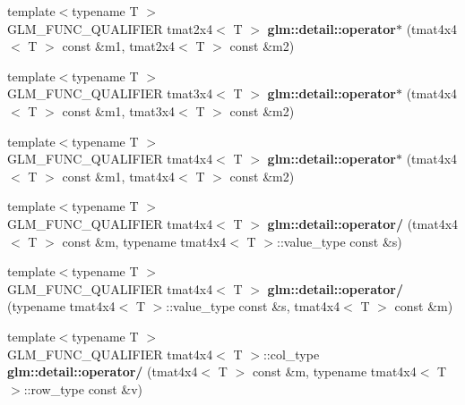\begin{DoxyCompactItemize}
\item 
\hypertarget{namespaceglm_1_1detail_a9ffe734881cad285ce8be6f50b225dd6}{}{\footnotesize template$<$typename T $>$ }\\G\+L\+M\+\_\+\+F\+U\+N\+C\+\_\+\+Q\+U\+A\+L\+I\+F\+I\+E\+R tmat2x4$<$ T $>$ {\bfseries glm\+::detail\+::operator$\ast$} (tmat4x4$<$ T $>$ const \&m1, tmat2x4$<$ T $>$ const \&m2)\label{namespaceglm_1_1detail_a9ffe734881cad285ce8be6f50b225dd6}

\item 
\hypertarget{namespaceglm_1_1detail_ad6d969daf73291b215cd460150306857}{}{\footnotesize template$<$typename T $>$ }\\G\+L\+M\+\_\+\+F\+U\+N\+C\+\_\+\+Q\+U\+A\+L\+I\+F\+I\+E\+R tmat3x4$<$ T $>$ {\bfseries glm\+::detail\+::operator$\ast$} (tmat4x4$<$ T $>$ const \&m1, tmat3x4$<$ T $>$ const \&m2)\label{namespaceglm_1_1detail_ad6d969daf73291b215cd460150306857}

\item 
\hypertarget{namespaceglm_1_1detail_a35c87764ddeb928087a04465e14f732b}{}{\footnotesize template$<$typename T $>$ }\\G\+L\+M\+\_\+\+F\+U\+N\+C\+\_\+\+Q\+U\+A\+L\+I\+F\+I\+E\+R tmat4x4$<$ T $>$ {\bfseries glm\+::detail\+::operator$\ast$} (tmat4x4$<$ T $>$ const \&m1, tmat4x4$<$ T $>$ const \&m2)\label{namespaceglm_1_1detail_a35c87764ddeb928087a04465e14f732b}

\item 
\hypertarget{namespaceglm_1_1detail_a45028fc42b0b726fd694f154549e0fba}{}{\footnotesize template$<$typename T $>$ }\\G\+L\+M\+\_\+\+F\+U\+N\+C\+\_\+\+Q\+U\+A\+L\+I\+F\+I\+E\+R tmat4x4$<$ T $>$ {\bfseries glm\+::detail\+::operator/} (tmat4x4$<$ T $>$ const \&m, typename tmat4x4$<$ T $>$\+::value\+\_\+type const \&s)\label{namespaceglm_1_1detail_a45028fc42b0b726fd694f154549e0fba}

\item 
\hypertarget{namespaceglm_1_1detail_a36ef07e879cd9ff478300d31e1119228}{}{\footnotesize template$<$typename T $>$ }\\G\+L\+M\+\_\+\+F\+U\+N\+C\+\_\+\+Q\+U\+A\+L\+I\+F\+I\+E\+R tmat4x4$<$ T $>$ {\bfseries glm\+::detail\+::operator/} (typename tmat4x4$<$ T $>$\+::value\+\_\+type const \&s, tmat4x4$<$ T $>$ const \&m)\label{namespaceglm_1_1detail_a36ef07e879cd9ff478300d31e1119228}

\item 
\hypertarget{namespaceglm_1_1detail_ab61569f90e0a8261a3c42fb50803b220}{}{\footnotesize template$<$typename T $>$ }\\G\+L\+M\+\_\+\+F\+U\+N\+C\+\_\+\+Q\+U\+A\+L\+I\+F\+I\+E\+R tmat4x4$<$ T $>$\+::col\+\_\+type {\bfseries glm\+::detail\+::operator/} (tmat4x4$<$ T $>$ const \&m, typename tmat4x4$<$ T $>$\+::row\+\_\+type const \&v)\label{namespaceglm_1_1detail_ab61569f90e0a8261a3c42fb50803b220}


\end{DoxyCompactItemize}
